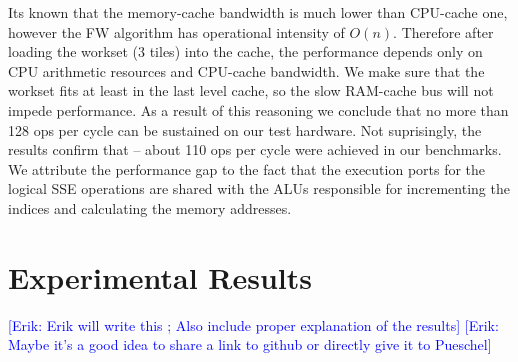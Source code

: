 \documentclass[letterpaper]{article}
\newcommand{\erik}[1]{\textcolor{blue}{[Erik: #1]}}
\begin{document}
Its known that the memory-cache bandwidth is much lower than CPU-cache one, however the FW algorithm has operational intensity of \(O(n)\). 
Therefore after loading the workset (3 tiles) into the cache, the performance depends only on CPU arithmetic resources and CPU-cache bandwidth. 
We make sure that the workset fits at least in the last level cache, so the slow RAM-cache bus will not impede performance. As a result of this reasoning we conclude that no more than 
128 ops per cycle can be sustained on our test hardware. Not suprisingly, the results confirm that -- about 110 ops per cycle were achieved in our benchmarks. We attribute the performance gap to the fact that 
the execution ports for the logical SSE operations are shared with the ALUs responsible for incrementing the indices and calculating the memory addresses.

\section{Experimental Results}\label{sec:exp}
\erik{Erik will write this ; Also include proper explanation of the results}
\erik{Maybe it's a good idea to share a link to github or directly give it to Pueschel}
\end{document}
